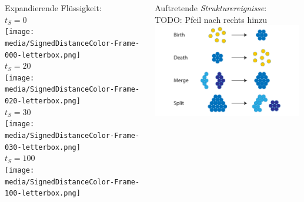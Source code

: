 \documentclass[10pt]{beamer}
\newcommand{\wichtig}[1]{\textit{#1}}
\begin{document}
\begin{frame}
	\begin{columns}[T]
		\begin{column}{5.5cm}
		Expandierende Flüssigkeit:\\
		{\scriptsize $t_S=0$}\\
		\texttt{[image: media/SignedDistanceColor-Frame-000-letterbox.png]}\\

		{\scriptsize $t_S=20$}\\		
		\texttt{[image: media/SignedDistanceColor-Frame-020-letterbox.png]}\\

		{\scriptsize $t_S=30$}\\		
		\texttt{[image: media/SignedDistanceColor-Frame-030-letterbox.png]}\\

		{\scriptsize $t_S=100$}\\		
		\texttt{[image: media/SignedDistanceColor-Frame-100-letterbox.png]}\\
		\end{column}
		\begin{column}{6.5cm}
			Auftretende \wichtig{Strukturereignisse}:\\
			TODO: Pfeil nach rechts hinzu
			\includegraphics*[width=6.5cm]{media/Strukturereignisse.png}
		\end{column}
	\end{columns}

\end{frame}
\end{document}
